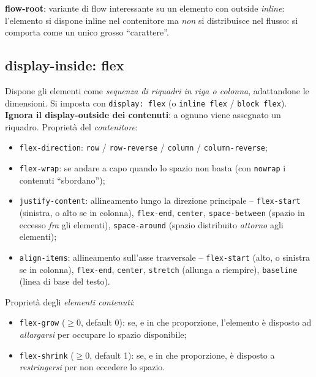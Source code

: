 \textbf{flow-root}: variante di flow interessante su un elemento con outside \emph{inline}:
l'elemento si dispone inline nel contenitore ma \emph{non} si distribuisce nel flusso: si
comporta come un unico grosso ``carattere''.

\subsection{display-inside: flex}
Dispone gli elementi come \emph{sequenza di riquadri in riga o colonna}, adattandone le
dimensioni. Si imposta con \texttt{display: flex} (o \texttt{inline flex} /
\texttt{block flex}). \textbf{Ignora il display-outside dei contenuti}: a ognuno viene
assegnato un riquadro. Propriet\`a del \emph{contenitore}:
\begin{itemize}
  \item \texttt{flex-direction}: \texttt{row} / \texttt{row-reverse} / \texttt{column} /
        \texttt{column-reverse};
  \item \texttt{flex-wrap}: se andare a capo quando lo spazio non basta (con \texttt{nowrap}
        i contenuti ``sbordano'');
  \item \texttt{justify-content}: allineamento lungo la direzione principale --
        \texttt{flex-start} (sinistra, o alto se in colonna), \texttt{flex-end},
        \texttt{center}, \texttt{space-between} (spazio in eccesso \emph{fra} gli elementi),
        \texttt{space-around} (spazio distribuito \emph{attorno} agli elementi);
  \item \texttt{align-items}: allineamento sull'asse trasversale -- \texttt{flex-start}
        (alto, o sinistra se in colonna), \texttt{flex-end}, \texttt{center},
        \texttt{stretch} (allunga a riempire), \texttt{baseline} (linea di base del testo).
\end{itemize}
Propriet\`a degli \emph{elementi contenuti}:
\begin{itemize}
  \item \texttt{flex-grow} ($\geq 0$, default 0): se, e in che proporzione, l'elemento \`e
        disposto ad \emph{allargarsi} per occupare lo spazio disponibile;
  \item \texttt{flex-shrink} ($\geq 0$, default 1): se, e in che proporzione, \`e disposto a
        \emph{restringersi} per non eccedere lo spazio.
\end{itemize}

